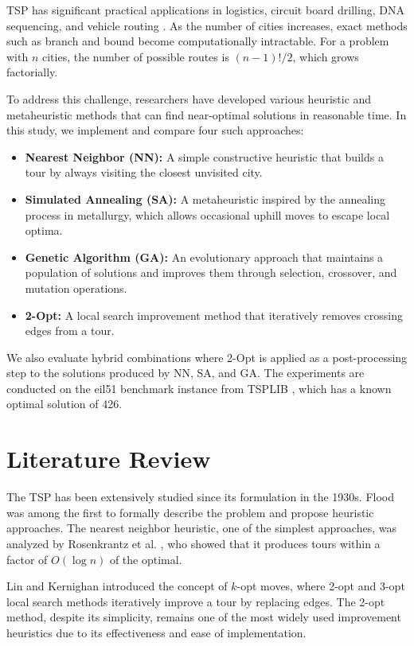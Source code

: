 \documentclass[conference]{IEEEtran}
\begin{document}
TSP has significant practical applications in logistics, circuit board drilling, DNA sequencing, and vehicle routing \cite{applegate2006}. As the number of cities increases, exact methods such as branch and bound become computationally intractable. For a problem with $n$ cities, the number of possible routes is $(n-1)!/2$, which grows factorially.

To address this challenge, researchers have developed various heuristic and metaheuristic methods that can find near-optimal solutions in reasonable time. In this study, we implement and compare four such approaches:

\begin{itemize}
    \item \textbf{Nearest Neighbor (NN):} A simple constructive heuristic that builds a tour by always visiting the closest unvisited city.
    \item \textbf{Simulated Annealing (SA):} A metaheuristic inspired by the annealing process in metallurgy, which allows occasional uphill moves to escape local optima.
    \item \textbf{Genetic Algorithm (GA):} An evolutionary approach that maintains a population of solutions and improves them through selection, crossover, and mutation operations.
    \item \textbf{2-Opt:} A local search improvement method that iteratively removes crossing edges from a tour.
\end{itemize}

We also evaluate hybrid combinations where 2-Opt is applied as a post-processing step to the solutions produced by NN, SA, and GA. The experiments are conducted on the eil51 benchmark instance from TSPLIB \cite{reinelt1991}, which has a known optimal solution of 426.

\section{Literature Review}

The TSP has been extensively studied since its formulation in the 1930s. Flood \cite{flood1956} was among the first to formally describe the problem and propose heuristic approaches. The nearest neighbor heuristic, one of the simplest approaches, was analyzed by Rosenkrantz et al. \cite{rosenkrantz1977}, who showed that it produces tours within a factor of $O(\log n)$ of the optimal.

Lin and Kernighan \cite{lin1973} introduced the concept of $k$-opt moves, where 2-opt and 3-opt local search methods iteratively improve a tour by replacing edges. The 2-opt method, despite its simplicity, remains one of the most widely used improvement heuristics due to its effectiveness and ease of implementation.
\end{document}
